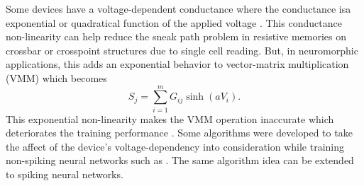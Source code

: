 \documentclass[english]{article}
\renewcommand{\cite}{\citep}
\begin{document}
Some devices have a voltage-dependent conductance where the conductance isa  exponential or quadratical function of the applied voltage \cite{Fouda_etal18_modeanal}. 
This conductance non-linearity can help reduce the sneak path problem in resistive memories on crossbar or crosspoint structures \cite{fouda2019resistive} due to single cell reading. 
But, in neuromorphic applications, this adds an exponential behavior to vector-matrix multiplication (VMM) which becomes
\begin{equation}
    S_j=\sum_{i=1}^m G_{ij} \sinh(a V_i). 
\end{equation}
\noindent This exponential non-linearity makes the VMM operation inaccurate which deteriorates the training performance \cite{kim2018deep}. Some algorithms were developed to take the affect of the device's voltage-dependency into consideration while training non-spiking neural networks such as \cite{kim2018deep}. The same algorithm idea can be extended to spiking neural networks.         
\end{document}
